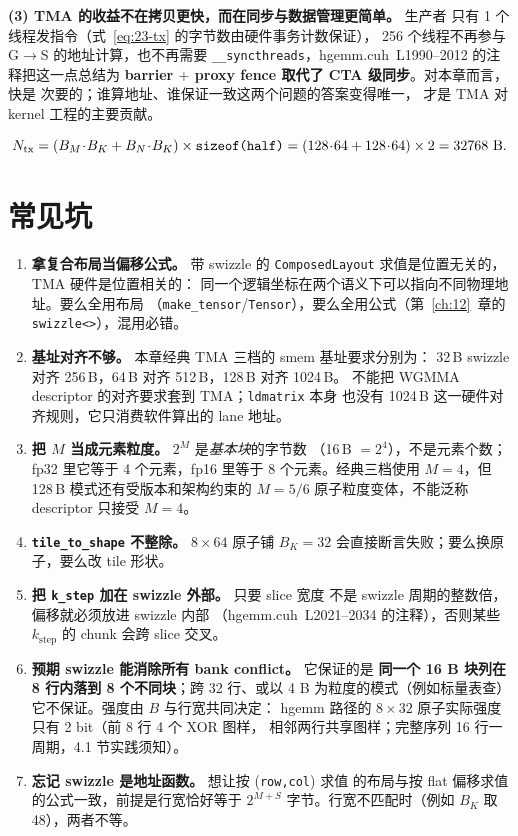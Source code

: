 \textbf{(3) TMA 的收益不在拷贝更快，而在同步与数据管理更简单。} 生产者
只有 1 个线程发指令（式~\eqref{eq:23-tx} 的字节数由硬件事务计数保证），
256 个线程不再参与 G$\to$S 的地址计算，也不再需要
\texttt{\_\allowbreak{}\_\allowbreak{}syncthreads}，hgemm.cuh~L1990--2012 的注释把这一点总结为
\textbf{barrier $+$ proxy fence 取代了 CTA 级同步}。对本章而言，快是
次要的；谁算地址、谁保证一致这两个问题的答案变得唯一，
才是 TMA 对 kernel 工程的主要贡献。

\begin{equation}
\label{eq:23-tx}
N_{\text{tx}} = (B_M\!\cdot\!B_K + B_N\!\cdot\!B_K)\times
\texttt{sizeof\allowbreak{}(half)} = (128\!\cdot\!64+128\!\cdot\!64)\times2 = 32768\ \text{B}.
\end{equation}

\section{常见坑}

\begin{enumerate}[leftmargin=2.2em]
\item \textbf{拿复合布局当偏移公式。} 带 swizzle 的
\texttt{Composed\allowbreak{}Layout} 求值是位置无关的，TMA 硬件是位置相关的：
同一个逻辑坐标在两个语义下可以指向不同物理地址。要么全用布局
（\texttt{make\_tensor}/\texttt{Tensor}），要么全用公式（第~\ref{ch:12}~章的
\texttt{swizzle<>}），混用必错。
\item \textbf{基址对齐不够。} 本章经典 TMA 三档的 smem 基址要求分别为：
32\,B swizzle 对齐 256\,B，64\,B 对齐 512\,B，128\,B 对齐 1024\,B。
不能把 WGMMA descriptor 的对齐要求套到 TMA；\texttt{ldmatrix} 本身
也没有 1024\,B 这一硬件对齐规则，它只消费软件算出的 lane 地址。
\item \textbf{把 $M$ 当成元素粒度。} $2^M$ 是\emph{基本块}的字节数
（16\,B $=2^4$），不是元素个数；fp32 里它等于 4 个元素，fp16 里等于
8 个元素。经典三档使用 $M=4$，但 128\,B 模式还有受版本和架构约束的
$M=5/6$ 原子粒度变体，不能泛称 descriptor 只接受 $M=4$。
\item \textbf{\texttt{tile\_\allowbreak{}to\_\allowbreak{}shape} 不整除。} $8\times64$ 原子铺
$B_K=32$ 会直接断言失败；要么换原子，要么改 tile 形状。
\item \textbf{把 \texttt{k\_step} 加在 swizzle 外部。} 只要 slice 宽度
不是 swizzle 周期的整数倍，偏移就必须放进 swizzle 内部
（hgemm.cuh~L2021--2034 的注释），否则某些 $k_{\text{step}}$ 的
chunk 会跨 slice 交叉。
\item \textbf{预期 swizzle 能消除所有 bank conflict。} 它保证的是
\textbf{同一个 16 B 块列在 8 行内落到 8 个不同块}；跨 32 行、或以
4 B 为粒度的模式（例如标量表查）它不保证。强度由 $B$ 与行宽共同决定：
hgemm 路径的 $8\times32$ 原子实际强度只有 2 bit（前 8 行 4 个 XOR 图样，
相邻两行共享图样；完整序列 16 行一周期，4.1 节实践须知）。
\item \textbf{忘记 swizzle 是地址函数。} 想让按 (\texttt{row,col}) 求值
的布局与按 flat 偏移求值的公式一致，前提是行宽恰好等于
$2^{M+S}$ 字节。行宽不匹配时（例如 $B_K$ 取 48），两者不等。
\end{enumerate}

